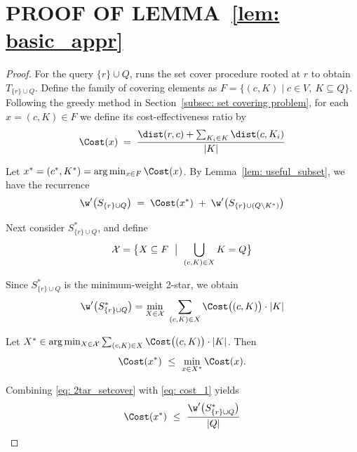 \iffalse
\section{PROOF OF LEMMA~\ref{lem: basic_appr}}
\label{app: basic_appr_proof}
\begin{proof}
    For the query $\{r\}\cup Q$, \Basic runs the set cover procedure rooted at $r$ to obtain $T_{\{r\}\cup Q}$. Define the family of covering elements as $F=\{(c, K)\mid c\in V,\  K\subseteq Q\}$. Following the greedy method in Section~\ref{subsec: set covering problem}, for each $x=(c, K)\in F$ we define its cost-effectiveness ratio by
    \begin{gather}
        \label{eq: cost}
        \Cost(x)\;=\;\frac{\dist(r,c)+\sum_{K_i\in K}\dist(c,K_i)}{| K|}
    \end{gather}
    
    Let $x^*=(c^*, K^*)=\arg\min_{x\in F}\Cost(x)$. By Lemma~\ref{lem: useful_subset}, we have the recurrence
    \begin{gather}
        \label{eq: basic_rec}
        \w'\big(S_{\{r\}\cup Q}\big)\;=\;\Cost(x^*)\;+\;\w'\big(S_{\{r\}\cup( Q\setminus  K^*)}\big)
    \end{gather}
    
    Next consider $S^*_{\{r\}\cup Q}$, and define
    \begin{gather}
        \label{eq: CFQ}
        \mathcal{X}
        =\bigl\{X\subseteq F\ \bigm|\ \bigcup_{(c, K)\in X} K= Q\bigr\}
    \end{gather}
    
    Since $S^*_{\{r\}\cup Q}$ is the minimum-weight 2-star, we obtain
    \begin{gather}
    \label{eq: 2tar_setcover}
        \w'\big(S^*_{\{r\}\cup Q}\big)
        =\min_{X\in \mathcal{X}}\ \sum_{(c, K)\in X} \Cost\big((c, K)\big)\cdot | K|
    \end{gather}
    
    Let $X^*\in \arg\min_{X\in \mathcal{X}}\sum_{(c, K)\in X} \Cost\big((c, K)\big)\cdot | K|$. Then
    \begin{gather}
        \label{eq: cost_1}
        \Cost(x^*)\ \le\ \min_{x\in X^*}\Cost(x).
    \end{gather}
    
    Combining \eqref{eq: 2tar_setcover} with \eqref{eq: cost_1} yields
    \begin{gather}
    \label{eq: cost_2}
        \Cost(x^*)\ \le\ \frac{\w'\big(S^*_{\{r\}\cup Q}\big)}{| Q|}
    \end{gather}


\end{proof}

